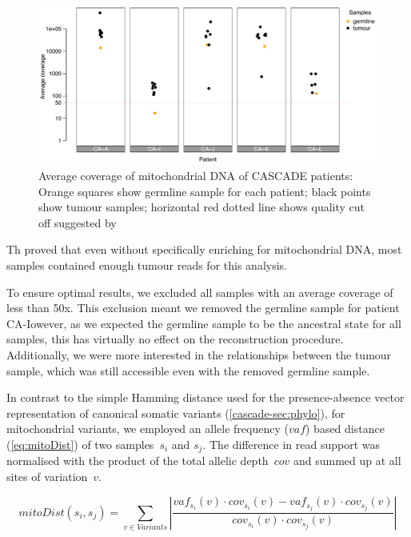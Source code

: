 \begin{figure}[hbt]
\centering
\includegraphics[width=.99\linewidth]{Figures/CASCADE/mito/mtCoverage}
\vspace{-1em}
\caption[Average coverage of mitochondrial DNA of CASCADE patients]{Average coverage of mitochondrial DNA of CASCADE patients: Orange squares show germline sample for each patient; black points show tumour samples; horizontal red dotted line shows quality cut off suggested by \protect\textcite{Ludwig2019}} \label{fig:mtCoverage}
\end{figure}


Th proved that even without specifically enriching for mitochondrial DNA, most samples contained enough tumour reads for this analysis.

To ensure optimal results, we excluded all samples with an average coverage of less than 50x. This exclusion meant we removed the germline sample for patient CA-Iowever, as we expected the germline sample to be the ancestral state for all samples, this has virtually no effect on the reconstruction procedure. Additionally, we were more interested in the relationships between the tumour sample, which was still accessible even with the removed germline sample.

In contrast to the simple Hamming distance used for the presence-absence vector representation of canonical somatic variants (\autoref{cascade-sec:phylo}), for mitochondrial variants, we employed an allele frequency ($vaf$) based distance (\autoref{eq:mitoDist}) of two samples~$s_i$ and $s_j$. The difference in read support was normalised with the product of the total allelic depth~$cov$ and summed up at all sites of variation~$v$.

\begin{equation}
mitoDist(s_i,s_j) = \sum_{v \in Variants} \left| \frac{vaf_{s_i}(v) \cdot cov_{s_i}(v) - vaf_{s_j}(v) \cdot cov_{s_j}(v)}{cov_{s_i}(v) \cdot cov_{s_j}(v)} \right| \label{eq:mitoDist}
\end{equation}
\myequation[\ref{eq:mitoDist}]{Mitochondrial variants based distance function of two samples}

